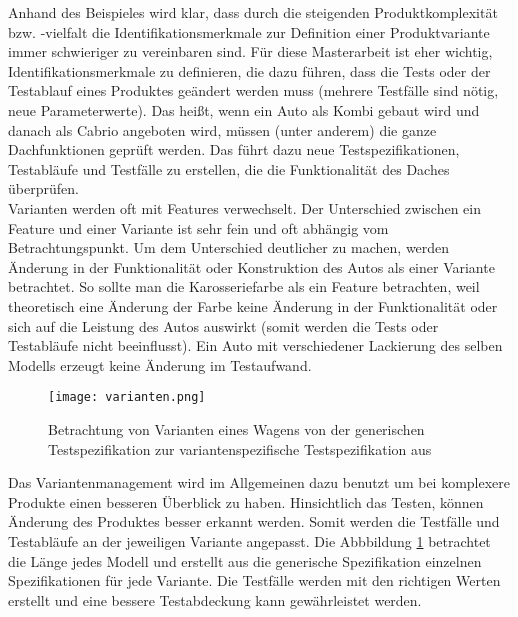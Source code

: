 Anhand des Beispieles wird klar, dass durch die steigenden Produktkomplexität bzw. -vielfalt die Identifikationsmerkmale zur Definition einer Produktvariante immer schwieriger zu vereinbaren sind. Für diese Masterarbeit ist eher wichtig, Identifikationsmerkmale zu definieren, die dazu führen, dass die Tests oder der Testablauf eines Produktes geändert werden muss (mehrere Testfälle sind nötig, neue Parameterwerte). Das heißt, wenn ein Auto als Kombi gebaut wird und danach als Cabrio angeboten wird, müssen (unter anderem) die ganze Dachfunktionen geprüft werden. Das führt dazu neue Testspezifikationen, Testabläufe und Testfälle zu erstellen, die die Funktionalität des Daches überprüfen.\\


Varianten werden oft mit Features verwechselt. Der Unterschied zwischen ein Feature und einer Variante ist sehr fein und oft abhängig vom Betrachtungspunkt. Um dem Unterschied deutlicher zu machen, werden Änderung in der Funktionalität oder Konstruktion des Autos als einer Variante betrachtet. So sollte man die Karosseriefarbe als ein Feature betrachten, weil theoretisch eine Änderung der Farbe keine Änderung in der Funktionalität oder sich auf die Leistung des Autos auswirkt (somit werden die Tests oder Testabläufe nicht beeinflusst). Ein Auto mit verschiedener Lackierung des selben Modells erzeugt keine Änderung im Testaufwand.\cite{VarMan2}\\


\begin{figure}[h]
  \begin{center}
    \texttt{[image: varianten.png]}
  		  \caption{Betrachtung von Varianten eines Wagens von der generischen Testspezifikation zur variantenspezifische Testspezifikation aus \cite{VarMan1}}
     \label{variantsOverview}
  \end{center}
\end{figure}


Das Variantenmanagement wird im Allgemeinen dazu benutzt um bei komplexere Produkte einen besseren Überblick zu haben. Hinsichtlich das Testen, können Änderung des Produktes besser erkannt werden. Somit werden die Testfälle und Testabläufe an der jeweiligen Variante angepasst. Die Abbbildung \ref{variantsOverview} betrachtet die Länge jedes Modell und erstellt aus die generische Spezifikation einzelnen Spezifikationen für jede Variante. Die Testfälle werden mit den richtigen Werten erstellt und eine bessere Testabdeckung kann gewährleistet werden.\\


